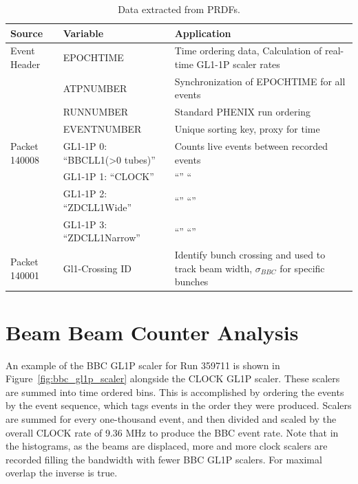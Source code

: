 \begin{table}[ht]
\centering
\begin{tabular}{ p{2cm} p{5.5 cm} p{6cm} }
\toprule
\textbf{Source} & \textbf{Variable} & \textbf{Application} \\
\midrule 
Event Header & EPOCHTIME & Time ordering data, Calculation of real-time GL1-1P scaler rates \\
 & ATPNUMBER & Synchronization of EPOCHTIME for all events \\
 & RUNNUMBER & Standard PHENIX run ordering  \\
 & EVENTNUMBER & Unique sorting key, proxy for time \\
\midrule
Packet 140008 & GL1-1P 0: ``BBCLL1(\textgreater0 tubes)'' & Counts live events between recorded events \\
              & GL1-1P 1: ``CLOCK'' &  ``'' `` \\
              & GL1-1P 2: ``ZDCLL1Wide''& ``'' ``''\\
              & GL1-1P 3: ``ZDCLL1Narrow''& ``'' ``'' \\
\midrule
Packet 140001 & Gl1-Crossing ID & Identify bunch crossing and used to track beam width, $\sigma_{BBC}$  for specific bunches\\
\bottomrule
\end{tabular}
\caption{ Data extracted from PRDFs. }
\label{tab:prdf_data_summary}
\end{table}

\section{Beam Beam Counter Analysis}
\label{sec:bbc_rate}

An example of the BBC GL1P scaler for Run 359711 is shown in
Figure~\ref{fig:bbc_gl1p_scaler} alongside the CLOCK GL1P scaler. These scalers
are summed into time ordered bins. This is accomplished by ordering the events
by the event sequence, which tags events in the order they were produced.
Scalers are summed for every one-thousand event, and then divided and scaled by
the overall CLOCK rate of 9.36 MHz to produce the BBC event rate. Note that in
the histograms, as the beams are displaced, more and more clock scalers are
recorded filling the bandwidth with fewer BBC GL1P scalers.  For maximal overlap
the inverse is true.

